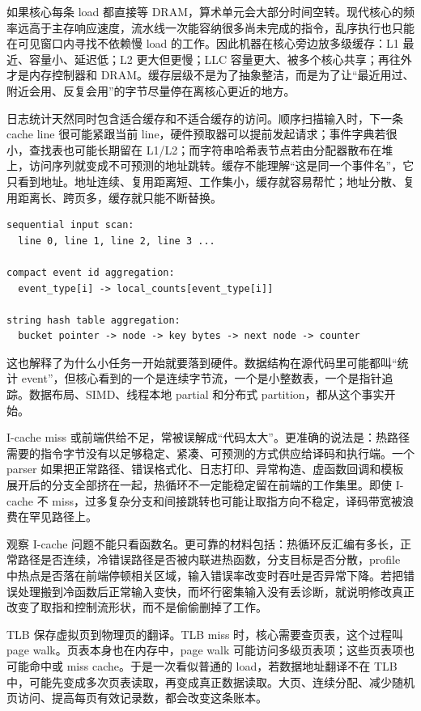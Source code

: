 如果核心每条 load 都直接等 DRAM，算术单元会大部分时间空转。现代核心的频率远高于主存响应速度，流水线一次能容纳很多尚未完成的指令，乱序执行也只能在可见窗口内寻找不依赖慢 load 的工作。因此机器在核心旁边放多级缓存：L1 最近、容量小、延迟低；L2 更大但更慢；LLC 容量更大、被多个核心共享；再往外才是内存控制器和 DRAM。缓存层级不是为了抽象整洁，而是为了让“最近用过、附近会用、反复会用”的字节尽量停在离核心更近的地方。

日志统计天然同时包含适合缓存和不适合缓存的访问。顺序扫描输入时，下一条 cache line 很可能紧跟当前 line，硬件预取器可以提前发起请求；事件字典若很小，查找表也可能长期留在 L1/L2；而字符串哈希表节点若由分配器散布在堆上，访问序列就变成不可预测的地址跳转。缓存不能理解“这是同一个事件名”，它只看到地址。地址连续、复用距离短、工作集小，缓存就容易帮忙；地址分散、复用距离长、跨页多，缓存就只能不断替换。

\begin{lstlisting}[numbers=none,caption={同一个语义在缓存眼里的三种形状}]
sequential input scan:
  line 0, line 1, line 2, line 3 ...

compact event id aggregation:
  event_type[i] -> local_counts[event_type[i]]

string hash table aggregation:
  bucket pointer -> node -> key bytes -> next node -> counter
\end{lstlisting}

这也解释了为什么小任务一开始就要落到硬件。数据结构在源代码里可能都叫“统计 event”，但核心看到的一个是连续字节流，一个是小整数表，一个是指针追踪。数据布局、SIMD、线程本地 partial 和分布式 partition，都从这个事实开始。

I-cache miss 或前端供给不足，常被误解成“代码太大”。更准确的说法是：热路径需要的指令字节没有以足够稳定、紧凑、可预测的方式供应给译码和执行端。一个 parser 如果把正常路径、错误格式化、日志打印、异常构造、虚函数回调和模板展开后的分支全部挤在一起，热循环不一定能稳定留在前端的工作集里。即使 I-cache 不 miss，过多复杂分支和间接跳转也可能让取指方向不稳定，译码带宽被浪费在罕见路径上。

观察 I-cache 问题不能只看函数名。更可靠的材料包括：热循环反汇编有多长，正常路径是否连续，冷错误路径是否被内联进热函数，分支目标是否分散，profile 中热点是否落在前端停顿相关区域，输入错误率改变时吞吐是否异常下降。若把错误处理搬到冷函数后正常输入变快，而坏行密集输入没有丢诊断，就说明修改真正改变了取指和控制流形状，而不是偷偷删掉了工作。

TLB 保存虚拟页到物理页的翻译。TLB miss 时，核心需要查页表，这个过程叫 page walk。页表本身也在内存中，page walk 可能访问多级页表项；这些页表项也可能命中或 miss cache。于是一次看似普通的 load，若数据地址翻译不在 TLB 中，可能先变成多次页表读取，再变成真正数据读取。大页、连续分配、减少随机页访问、提高每页有效记录数，都会改变这条账本。

